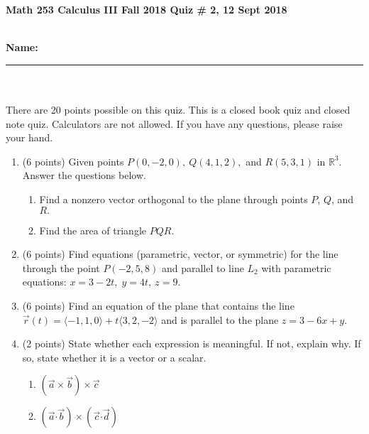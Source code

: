 \documentclass[11pt]{article}
\theoremstyle{remark}
\newcommand{\bcd}{\boldsymbol{\cdot}}
\begin{document}
{\bf Math 253 Calculus III Fall 2018 \hfill Quiz \# 2,  12 Sept 2018 }\\
\\
{\bf Name: \rule{3.5in}{1pt}}\\
\\
\noindent There are 20 points possible on this quiz. This is a closed
book quiz and closed note quiz. Calculators are not allowed. If you have any questions, please
raise your hand.

\begin{enumerate}
\item (6 points) Given points $P(0,-2,0), \: Q(4,1,2),$ and $R(5,3,1)$ in $\mathbb{R}^3.$ Answer the questions below.\\
\begin{enumerate}
\item Find a nonzero vector orthogonal to the plane through points $P$, $Q$, and $R.$
\vfill
\item Find the area of triangle $PQR.$
\vspace{1in}
\end{enumerate}
\item (6 points) Find equations (parametric, vector, or symmetric) for the line through the point $P(-2,5,8)$ and parallel to line $L_2$ with parametric equations: $x=3-2t, \; y=4t, \: z=9.$
\vspace{2in}
\newpage
\item (6 points) Find an equation of the plane that contains the line $\vec{r}(t)=\langle -1,1,0 \rangle + t \langle 3,2,-2 \rangle$ and is parallel to the plane $z=3-6x+y.$
\vfill
\item (2 points) State whether each expression is meaningful. If not, explain why. If so, state whether it is a vector or a scalar.
\begin{enumerate}
\item  $(\vec{a} \times \vec{b}) \times \vec{c}$
\vspace{1in}
\item $( \vec{a} \bcd \vec{b}) \times (\vec{c} \bcd \vec{d})$
\vspace{1in}
\end{enumerate}
\end{enumerate}
\end{document}
